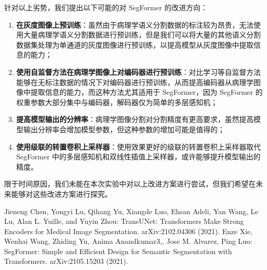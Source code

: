 \documentclass[hyperref,a4paper,UTF8]{ctexart}
\begin{document}
针对以上劣势，我们提出以下可能的对 SegFormer 的改进方向：

\begin{enumerate}[itemsep=2pt,topsep=0pt,parsep=0pt]
    \item \textbf{在灰度图像上预训练}：虽然由于病理学语义分割数据的标注较为昂贵，无法使用大量病理学语义分割数据进行预训练，但是我们可以将大量的其他语义分割数据集处理为单通道的灰度图像进行预训练，以提高模型从灰度图像中提取信息的能力；
    \item \textbf{使用自监督方法在病理学图像上对编码器进行预训练}：对比学习等自监督方法能够在无标注数据的情况下对编码器进行预训练，从而提高编码器从病理学图像中提取信息的能力，而这种方法尤其适用于 SegFormer，因为 SegFormer 的权重参数大部分集中与编码器，解码器仅为简单的多层感知机；
    \item \textbf{提高模型输出的分辨率}：病理学图像分割对分割精度有更高要求，虽然提高模型输出分辨率会增加模型参数，但这种参数的增加可能是值得的；
    \item \textbf{使用级联的转置卷积上采样器}：使用效果更好的级联的转置卷积上采样器取代 SegFormer 中的多层感知机和双线性插值上采样器，或许能够提升模型输出的精度。
\end{enumerate}

限于时间原因，我们未能在本次实验中对以上改进方案进行尝试，但我们希望在未来能够对这些改进方案进行探究。


\begin{thebibliography}{99}
Jieneng Chen, Yongyi Lu, Qihang Yu, Xiangde Luo, Ehsan Adeli, Yan Wang, Le Lu, Alan L. Yuille, and Yuyin Zhou: TransUNet: Transformers Make Strong
Encoders for Medical Image Segmentation. arXiv:2102.04306 (2021).
Enze Xie, Wenhai Wang, Zhiding Yu, Anima Anandkumar3,, Jose M. Alvarez, Ping Luo: SegFormer: Simple and Efficient Design for Semantic Segmentation with Transformers. arXiv:2105.15203 (2021).
\end{thebibliography}
\end{document}
